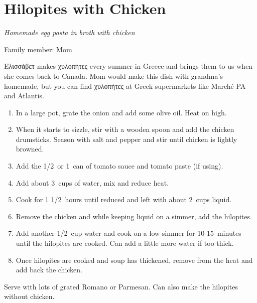 \chapter{Hilopites with Chicken}
\label{ch:hilopites}


\textit{Homemade egg pasta in broth with chicken}

Family member: Mom

 \textgreek{Ελισσάβετ} makes \textgreek{χυλοπήτες} every summer in Greece and brings them to us when she comes back to Canada. Mom would make this dish with grandma's homemade, but you can find \textgreek{χυλοπήτες} at Greek supermarkets like Marché PA and Atlantis.

\begin{enumerate}
    \item In a large pot, grate the onion and add some olive oil. Heat on high.
    \item When it starts to sizzle, stir with a wooden spoon and add the chicken drumsticks. Season with salt and pepper and stir until chicken is lightly browned.
    \item Add the 1/2~or 1~can of tomato sauce and tomato paste (if using).
    \item Add about 3~cups of water, mix and reduce heat.
    \item Cook for 1 1/2~hours until reduced and left with about 2~cups liquid.
    \item Remove the chicken and while keeping liquid on a simmer, add the hilopites.
    \item Add another 1/2~cup water and cook on a low simmer for 10-15~minutes until the hilopites are cooked. Can add a little more water if too thick.
    \item Once hilopites are cooked and soup has thickened, remove from the heat and add back the chicken.
\end{enumerate}

Serve with lots of grated Romano or Parmesan. Can also make the hilopites without chicken.
